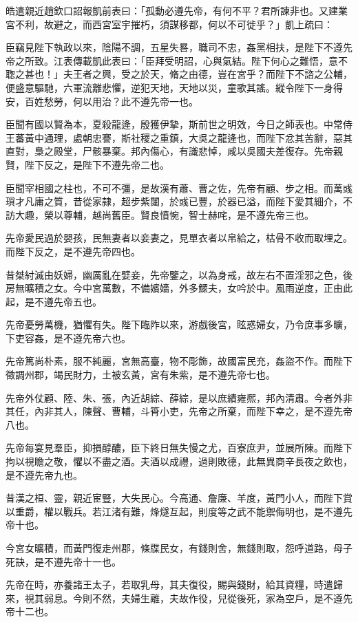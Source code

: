 \begin{pinyinscope}
皓遣親近趙欽口詔報凱前表曰：「孤動必遵先帝，有何不平？君所諫非也。又建業宮不利，故避之，而西宮室宇摧朽，須謀移都，何以不可徙乎？」凱上疏曰：

臣竊見陛下執政以來，陰陽不調，五星失晷，職司不忠，姦黨相扶，是陛下不遵先帝之所致。江表傳載凱此表曰：「臣拜受明詔，心與氣結。陛下何心之難悟，意不聦之甚也！」夫王者之興，受之於天，脩之由德，豈在宮乎？而陛下不諮之公輔，便盛意驅馳，六軍流離悲懼，逆犯天地，天地以災，童歌其謠。縱令陛下一身得安，百姓愁勞，何以用治？此不遵先帝一也。

臣聞有國以賢為本，夏殺龍逄，殷獲伊摯，斯前世之明效，今日之師表也。中常侍王蕃黃中通理，處朝忠謇，斯社稷之重鎮，大吳之龍逄也，而陛下忿其苦辭，惡其直對，梟之殿堂，尸骸暴棄。邦內傷心，有識悲悼，咸以吳國夫差復存。先帝親賢，陛下反之，是陛下不遵先帝二也。

臣聞宰相國之柱也，不可不彊，是故漢有蕭、曹之佐，先帝有顧、步之相。而萬彧瑣才凡庸之質，昔從家隷，超步紫闥，於彧已豐，於器已溢，而陛下愛其細介，不訪大趣，榮以尊輔，越尚舊臣。賢良憤惋，智士赫咤，是不遵先帝三也。

先帝愛民過於嬰孩，民無妻者以妾妻之，見單衣者以帛給之，枯骨不收而取埋之。而陛下反之，是不遵先帝四也。

昔桀紂滅由妖婦，幽厲亂在嬖妾，先帝鑒之，以為身戒，故左右不置淫邪之色，後房無曠積之女。今中宮萬數，不備嬪嬙，外多鰥夫，女吟於中。風雨逆度，正由此起，是不遵先帝五也。

先帝憂勞萬機，猶懼有失。陛下臨阼以來，游戲後宮，眩惑婦女，乃令庶事多曠，下吏容姦，是不遵先帝六也。

先帝篤尚朴素，服不純麗，宮無高臺，物不彫飾，故國富民充，姦盜不作。而陛下徵調州郡，竭民財力，土被玄黃，宮有朱紫，是不遵先帝七也。

先帝外仗顧、陸、朱、張，內近胡綜、薛綜，是以庶績雍熈，邦內清肅。今者外非其任，內非其人，陳聲、曹輔，斗筲小吏，先帝之所棄，而陛下幸之，是不遵先帝八也。

先帝每宴見羣臣，抑損醇醲，臣下終日無失慢之尤，百寮庶尹，並展所陳。而陛下拘以視瞻之敬，懼以不盡之酒。夫酒以成禮，過則敗德，此無異商辛長夜之飲也，是不遵先帝九也。

昔漢之桓、靈，親近宦豎，大失民心。今高通、詹廉、羊度，黃門小人，而陛下賞以重爵，權以戰兵。若江渚有難，烽燧互起，則度等之武不能禦侮明也，是不遵先帝十也。

今宮女曠積，而黃門復走州郡，條牒民女，有錢則舍，無錢則取，怨呼道路，母子死訣，是不遵先帝十一也。

先帝在時，亦養諸王太子，若取乳母，其夫復役，賜與錢財，給其資糧，時遣歸來，視其弱息。今則不然，夫婦生離，夫故作役，兒從後死，家為空戶，是不遵先帝十二也。


\end{pinyinscope}

